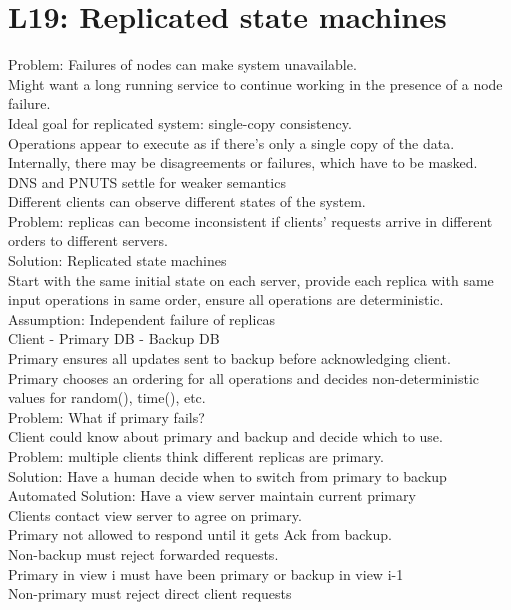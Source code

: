 \section{L19: Replicated state machines}
Problem: Failures of nodes can make system unavailable.\\
Might want a long running service to continue working in the presence of a node failure.\\
Ideal goal for replicated system: single-copy consistency.\\
Operations appear to execute as if there's only a single copy of the data. Internally, there may be disagreements or failures, which have to be masked.\\
DNS and PNUTS settle for weaker semantics\\
Different clients can observe different states of the system.\\
Problem: replicas can become inconsistent if clients' requests arrive in different orders to different servers.\\
Solution: Replicated state machines\\
Start with the same initial state on each server, provide each replica with same input operations in same order, ensure all operations are deterministic.\\
Assumption: Independent failure of replicas\\
Client - Primary DB - Backup DB\\
Primary ensures all updates sent to backup before acknowledging client.\\
Primary chooses an ordering for all operations and decides non-deterministic values for random(), time(), etc.\\
Problem: What if primary fails?\\
Client could know about primary and backup and decide which to use.\\
Problem: multiple clients think different replicas are primary.\\
Solution: Have a human decide when to switch from primary to backup\\
Automated Solution: Have a view server maintain current primary\\
Clients contact view server to agree on primary.\\
Primary not allowed to respond until it gets Ack from backup.\\
Non-backup must reject forwarded requests.\\
Primary in view i must have been primary or backup in view i-1\\
Non-primary must reject direct client requests
